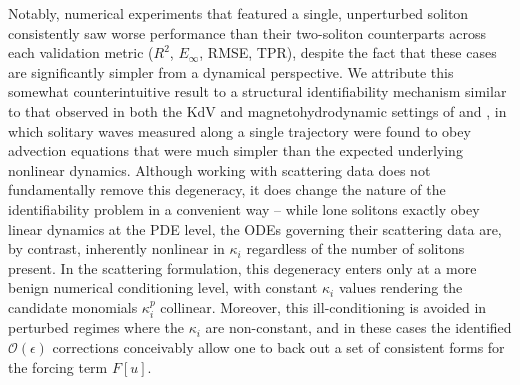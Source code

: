 \documentclass[journal=gmj]{CUP-JNL-DTM}%
\theoremstyle{definition}
\numberwithin{equation}{section}
\begin{document}
\clearpage

Notably, numerical experiments that featured a single, unperturbed soliton consistently saw worse performance than their two-soliton counterparts across each validation metric ($R^2$, $E_\infty$, RMSE, TPR), despite the fact that these cases are significantly simpler from a dynamical perspective. We attribute this somewhat counterintuitive result to a structural identifiability mechanism similar to that observed in both the KdV and magnetohydrodynamic settings of \cite{Rudy.etal2017SciAdv} and \cite{Vasey.etal2025JournalofComputationalPhysics}, in which solitary waves measured along a single trajectory were found to obey advection equations that were much simpler than the expected underlying nonlinear dynamics. Although working with scattering data does not fundamentally remove this degeneracy, it does change the nature of the identifiability problem in a convenient way -- while lone solitons exactly obey linear dynamics at the PDE level, the ODEs governing their scattering data are, by contrast, inherently nonlinear in $\kappa_i$ regardless of the number of solitons present. In the scattering formulation, this degeneracy enters only at a more benign numerical conditioning level, with constant $\kappa_i$ values rendering the candidate monomials $\kappa^p_i$ collinear. Moreover, this ill-conditioning is avoided in perturbed regimes where the $\kappa_i$ are non-constant, and in these cases the identified $\mathcal{O}(\epsilon)$ corrections conceivably allow one to back out a set of consistent forms for the forcing term $F[u]$.

\smallskip
\end{document}

